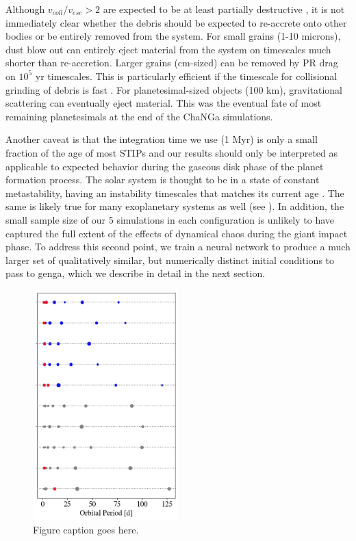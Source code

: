 Although $v_{coll}/v_{esc} > 2$ are expected to be at least partially destructive \cite{marcus09}, it is not immediately clear whether the debris should be expected to re-accrete onto other bodies or be entirely removed from the system. For small grains (1-10 microns), dust blow out can entirely eject material from the system on timescales much shorter than re-accretion. Larger grains (cm-sized) can be removed by PR drag on $10^{5}$ yr timescales. This is particularly efficient if the timescale for collisional grinding of debris is fast \cite{melis12}. For planetesimal-sized objects (100 km), gravitational scattering can eventually eject material. This was the eventual fate of most remaining planetesimals at the end of the {\sc ChaNGa} simulations.

Another caveat is that the integration time we use (1 Myr) is only a small fraction of the age of most STIPs \cite{silvaaguirre15} and our results should only be interpreted as applicable to expected behavior during the gaseous disk phase of the planet formation process. The solar system is thought to be in a state of constant metastability, having an instability timescales that matches its current age \cite{laskar96}. The same is likely true for many exoplanetary systems as well (see \cite{deck12, lissauer12, lissauer13}). In addition, the small sample size of our 5 simulations in each configuration is unlikely to have captured the full extent of the effects of dynamical chaos during the giant impact phase. To address this second point, we train a neural network to produce a much larger set of qualitatively similar, but numerically distinct initial conditions to pass to {\sc genga}, which we describe in detail in the next section.

\begin{figure}
\begin{center}
    \includegraphics[width=0.5\textwidth]{figures/stip/architectures_iso_comp.png}
    \caption{Figure caption goes here.\label{fig:architectures_iso_comp}}
\end{center}
\end{figure}

